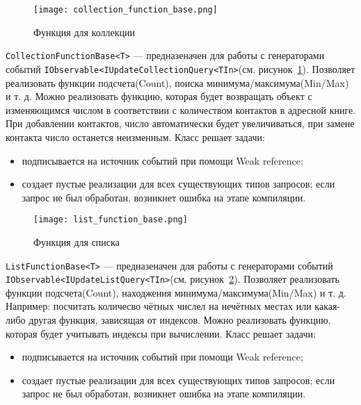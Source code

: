 \begin{figure}[ht]
\centering
  \texttt{[image: collection\_function\_base.png]}
  \caption{ Функция для коллекции }
  \label{fig:collection_function_base}
\end{figure}

\lstinline[style=csharpinlinestyle]!CollectionFunctionBase<T>! --- предназеначен для работы с генераторами событий
\lstinline[style=csharpinlinestyle]!IObservable<IUpdateCollectionQuery<TIn>!(см. рисунок~\ref{fig:collection_function_base}).
Позволяет реализовать функции подсчета(Count), поиска минимума/максимума(Min/Max) и т. д.
Можно реализовать функцию, которая будет возвращать объект с изменяющимся числом в соответствии с количеством контактов в адресной книге.
При добавлении контактов, число автоматически будет увеличиваться, при замене контакта число останется неизменным.
Класс решает задачи:

\begin{itemize}
  \item подписывается на источник событий при помощи Weak reference;
  \item создает пустые реализации для всех существующих типов запросов; если запрос не был обработан, возникнет ошибка на этапе компиляции.
\end{itemize}

\begin{figure}[ht]
\centering
  \texttt{[image: list\_function\_base.png]}
  \caption{ Функция для списка }
  \label{fig:list_function_base}
\end{figure}

\lstinline[style=csharpinlinestyle]!ListFunctionBase<T>! --- предназеначен для работы с генераторами событий
\lstinline[style=csharpinlinestyle]!IObservable<IUpdateListQuery<TIn>!(см. рисунок~\ref{fig:list_function_base}).
Позволяет реализовать функции подсчета(Count), находжения минимума/максимума(Min/Max) и т. д. Например: посчитать количесво чётных числел на нечётных местах или какая-либо другая функция,
зависящая от индексов. Можно реализовать функцию, которая будет учитывать индексы при вычислении.
Класс решает задачи:

\begin{itemize}
  \item подписывается на источник событий при помощи Weak reference;
  \item создает пустые реализации для всех существующих типов запросов; если запрос не был обработан, возникнет ошибка на этапе компиляции.
\end{itemize}

